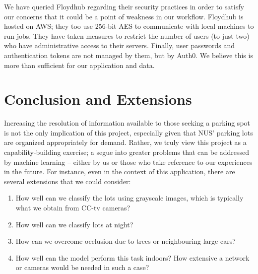 \documentclass[]{article}
\providecommand{\tightlist}{%
  \setlength{\itemsep}{0pt}\setlength{\parskip}{0pt}}
\begin{document}
We have queried Floydhub regarding their security practices in order to satisfy
our concerns that it could be a point of weakness in our workflow.  Floydhub is
hosted on AWS; they too use 256-bit AES to communicate with local machines to
run jobs. They have taken measures to restrict the number of users (to just
two) who have administrative access to their servers. Finally, user passwords
and authentication tokens are not managed by them, but by Auth0. We believe
this is more than sufficient for our application and data.

%

\section{Conclusion and Extensions}\label{conclusion}

Increasing the resolution of information available to those seeking a
parking spot is not the only implication of this project, especially
given that NUS' parking lots are organized appropriately for demand.
Rather, we truly view this project as a capability-building exercise; a segue
into greater problems that can be addressed by machine learning --
either by us or those who take reference to our experiences in the
future. For instance, even in the context of this application, there are
several extensions that we could consider:
\begin{enumerate}
\tightlist
\item How well can we classify the lots using grayscale images, which is
typically what we obtain from CC-tv cameras?
\item How well can we classify lots at night?
\item How can we overcome occlusion due to trees or neighbouring large cars?
\item How well can the model perform this task indoors? How extensive a network
or cameras would be needed in such a case?
\end{enumerate}




\end{document}
